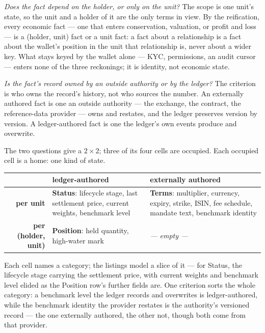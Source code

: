 \documentclass[11pt,a4paper]{article}
\begin{document}
\textit{Does the fact depend on the holder, or only on the unit?} The scope is one
unit's state, so the unit and a holder of it are the only terms in view. By the
reification, every economic fact --- one that enters conservation, valuation, or profit and loss ---
is a (holder, unit) fact or a unit fact: a fact about a relationship is a fact about the
wallet's position in the unit that relationship is, never about a wider key. What stays
keyed by the wallet alone --- KYC, permissions, an audit cursor --- enters none of the
three reckonings; it is identity, not economic state.

\textit{Is the fact's record owned by an outside authority or by the ledger?} The
criterion is who owns the record's history, not who sources the number. An externally
authored fact is one an outside authority --- the exchange, the contract, the
reference-data provider --- owns and restates, and the ledger preserves version by
version. A ledger-authored fact is one the ledger's own events produce and overwrite.

The two questions give a $2\times2$; three of its four cells are occupied. Each
occupied cell is a home: one kind of state.

\begin{center}\footnotesize
\begin{tabular}{@{}r|p{}p{}@{}}
 & \textbf{ledger-authored} & \textbf{externally authored} \\ \hline
\textbf{per unit} & \textbf{Status}: lifecycle stage, last settlement price, current
weights, benchmark level & \textbf{Terms}: multiplier, currency, expiry, strike, ISIN,
fee schedule, mandate text, benchmark identity \\[0.5ex]
\textbf{per (holder, unit)} & \textbf{Position}: held quantity, high-water mark &
\textit{--- empty ---} \\
\end{tabular}
\end{center}

Each cell names a category; the listings model a slice of it --- for Status, the
lifecycle stage carrying the settlement price, with current weights and benchmark level
elided as the Position row's further fields are. One criterion sorts the whole category: a
benchmark level the ledger records and overwrites is ledger-authored, while the
benchmark identity the provider restates is the authority's versioned record --- the one
externally authored, the other not, though both come from that provider.
\end{document}
